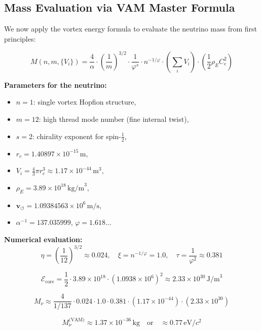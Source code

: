 \subsection{Mass Evaluation via VAM Master Formula}

We now apply the vortex energy formula to evaluate the neutrino mass from first principles:

\begin{equation}
\boxed{
M(n, m, \{V_i\}) = \frac{4}{\alpha} \cdot \left( \frac{1}{m} \right)^{3/2} \cdot \frac{1}{\varphi^s} \cdot n^{-1/\varphi} \cdot \left( \sum_i V_i \right) \cdot \left( \frac{1}{2} \rho_{\scriptscriptstyle\boldsymbol\!E}C_e^2 \right)
}
\end{equation}

\noindent
\textbf{Parameters for the neutrino:}
\begin{itemize}
    \item \(n = 1\): single vortex Hopfion structure,
    \item \(m = 12\): high thread mode number (fine internal twist),
    \item \(s = 2\): chirality exponent for spin-\(\frac{1}{2}\),
    \item \(r_c = 1.40897 \times 10^{-15} \, \text{m}\),
    \item \(V_i = \frac{4}{3} \pi r_c^3 \approx 1.17 \times 10^{-44} \, \text{m}^3\),
    \item \(\rho_{\scriptscriptstyle\boldsymbol\!E}= 3.89 \times 10^{18} \, \text{kg/m}^3\),
    \item \(\mathbf{v}_{\scriptscriptstyle\boldsymbol{\circlearrowleft}} = 1.09384563 \times 10^6 \, \text{m/s}\),
    \item \(\alpha^{-1} = 137.035999\), \quad \(\varphi = 1.618...\)
\end{itemize}

\noindent
\textbf{Numerical evaluation:}
\[
\eta = \left( \frac{1}{12} \right)^{3/2} \approx 0.024, \quad
\xi = n^{-1/\varphi} = 1.0, \quad
\tau = \frac{1}{\varphi^2} \approx 0.381
\]

\[
\mathcal{E}_\text{core} = \frac{1}{2} \cdot 3.89 \times 10^{18} \cdot (1.0938 \times 10^6)^2 \approx 2.33 \times 10^{30} \, \text{J/m}^3
\]

\[
M_\nu \approx \frac{4}{1/137} \cdot 0.024 \cdot 1.0 \cdot 0.381 \cdot (1.17 \times 10^{-44}) \cdot (2.33 \times 10^{30})
\]

\[
\boxed{
M_\nu^\text{(VAM)} \approx 1.37 \times 10^{-36} \, \text{kg}
}
\quad \text{or} \quad
\boxed{
\approx 0.77 \, \text{eV}/c^2
}
\]

